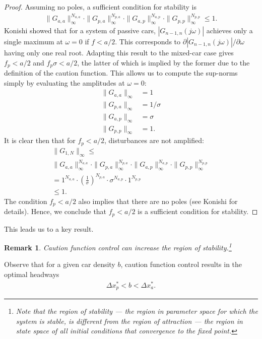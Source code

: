 \documentclass[10pt,twocolumn]{article}
\theoremstyle{ss}
\newtheorem{rmk}{Remark}[section]
\begin{document}
\begin{proof}
Assuming no poles, a sufficient condition for stability is
\begin{align*}
\|G_{a,a}\|_{\infty}^{N_{a,a}} \cdot \|G_{p,a}\|_{\infty}^{N_{p,a}} \cdot \|G_{a,p}\|_{\infty}^{N_{a,p}} \cdot \|G_{p,p}\|_{\infty}^{N_{p,p}} \leq 1.
\end{align*}
Konishi \cite{Konishi} showed that for a system of passive cars, $|G_{n-1,n}(j\omega)|$ achieves only a single maximum at $\omega=0$ if $f < a/2$. This corresponds to $\partial |G_{n-1,n}(j\omega)|/\partial \omega$ having only one real root. Adapting this result to the mixed-car case gives $f_p < a/2$ and $f_p\sigma < a/2$, the latter of which is implied by the former due to the definition of the caution function. This allows us to compute the sup-norms simply by evaluating the amplitudes at $\omega=0$:
\begin{align*}
\|G_{a,a}\|_{\infty} &= 1\\
\|G_{p,a}\|_{\infty} &= 1/\sigma\\
\|G_{a,p}\|_{\infty} &= \sigma\\
\|G_{p,p}\|_{\infty} &= 1.
\end{align*}
It is clear then that for $f_p < a/2$, disturbances are not amplified:
\begin{gather}
\|G_{1,N}\|_{\infty} \leq\\
\|G_{a,a}\|_{\infty}^{N_{a,a}} \cdot \|G_{p,a}\|_{\infty}^{N_{p,a}} \cdot \|G_{a,p}\|_{\infty}^{N_{a,p}} \cdot \|G_{p,p}\|_{\infty}^{N_{p,p}} \\
= 1^{N_{a,a}} \cdot \left(\frac{1}{\sigma}\right)^{N_{p,a}} \cdot \sigma^{N_{a,p}} \cdot 1^{N_{p,p}} \\
\leq 1.
\end{gather}
The condition $f_p < a/2$ also implies that there are no poles (see Konishi \cite{Konishi} for details). Hence, we conclude that $f_p < a/2$ is a sufficient condition for stability.
\end{proof}
This leads us to a key result.
\begin{rmk}
Caution function control can increase the region of stability.\footnote{Note that the region of stability --- the region in parameter space for which the system is stable, is different from the region of {\em attraction} --- the region in state space of all initial conditions that convergence to the fixed point.}
\end{rmk}
Observe that for a given car density $b$, caution function control results in the optimal headways 
\begin{gather}
\Delta x_p^* < b < \Delta x_a^*.
\end{gather}
\end{document}
